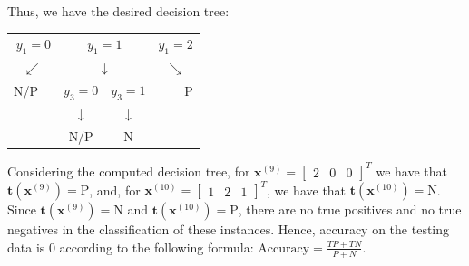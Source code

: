 \documentclass{exam}
\begin{document}
\begin{questions}
\begin{table}[H]
\begin{tabular}{lll|ll|ll|lll}
            \end{tabular}
        \end{table}
        Thus, we have the desired decision tree:
        \vspace{-0.25em}
        \begin{table}[H]
            \centering
            \begin{tabular}{llccrr}
            \multicolumn{2}{r}{$y_1 = 0$}  & \multicolumn{2}{c}{$y_1 = 1$}    & \multicolumn{2}{l}{$y_1 = 2$}  \\
            \multicolumn{2}{c}{$\swarrow$} & \multicolumn{2}{c}{$\downarrow$} & \multicolumn{2}{c}{$\searrow$} \\
            N/P         &                  & $y_3 = 0$       & $y_3 = 1$      &                     & P        \\
                        &        & $\downarrow$    & $\downarrow$   &        &          \\
                        &                  & N/P             & N              &                     &         
            \end{tabular}
        \end{table}
        \item Considering the computed decision tree, for $\textbf{x}^{(9)} = 
        \begin{bmatrix}
            2 & 0 & 0
        \end{bmatrix}^T$ 
        we have that $\textbf{\^{t}}(\textbf{x}^{(9)}) = \text{P}$, and, for $\textbf{x}^{(10)} = 
        \begin{bmatrix}
            1 & 2 & 1
        \end{bmatrix}^T$, we have that $\textbf{\^{t}}(\textbf{x}^{(10)}) = \text{N}$. Since $\textbf{t}(\textbf{x}^{(9)}) = \text{N}$ and $\textbf{t}(\textbf{x}^{(10)}) = \text{P}$, there are no true positives and no true negatives in the classification of these instances. Hence, accuracy on the testing data is 0 according to the following formula: $\text{Accuracy} = \frac{TP + TN}{P + N}$.

    \end{questions}
\end{document}
